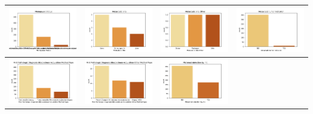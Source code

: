 \begin{center} 
	\begin{tabular}{ |c|c|c|c| } 
		\hline 
		\includegraphics[width=.25\textwidth]{NOTEBOOK/IMAGENES_CRUDAS/57} 
		& \includegraphics[width=.25\textwidth]{NOTEBOOK/IMAGENES_CRUDAS/58} 
		& \includegraphics[width=.25\textwidth]{NOTEBOOK/IMAGENES_CRUDAS/59} 
		& \includegraphics[width=.25\textwidth]{NOTEBOOK/IMAGENES_CRUDAS/60}   
		\\  \hline       
		\hline 
		\includegraphics[width=.25\textwidth]{NOTEBOOK/IMAGENES_CRUDAS/61} 
		& \includegraphics[width=.25\textwidth]{NOTEBOOK/IMAGENES_CRUDAS/62} 
		& \includegraphics[width=.25\textwidth]{NOTEBOOK/IMAGENES_CRUDAS/63} 

\end{tabular}
\end{center}
